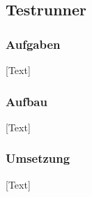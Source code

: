 
\subsection{Testrunner}

\subsubsection{Aufgaben}
[Text]

\subsubsection{Aufbau}
[Text]

\subsubsection{Umsetzung}
[Text]

